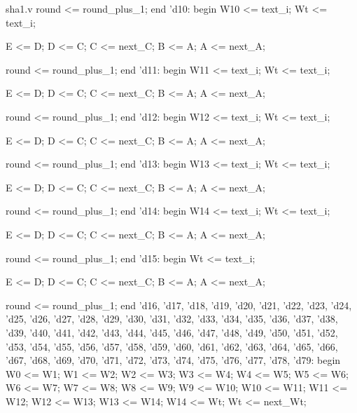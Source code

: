 \begin{chunk}{sha1.v}
          round <= round_plus_1;
        end
      'd10:
        begin
          W10 <= text_i;
          Wt <= text_i;
          
          E <= D;
          D <= C;
          C <= next_C;
          B <= A;
          A <= next_A;
            
          round <= round_plus_1;
        end
      'd11:
        begin
          W11 <= text_i;
          Wt <= text_i;
          
          E <= D;
          D <= C;
          C <= next_C;
          B <= A;
          A <= next_A;
            
          round <= round_plus_1;
        end
      'd12:
        begin
          W12 <= text_i;
          Wt <= text_i;
          
          E <= D;
          D <= C;
          C <= next_C;
          B <= A;
          A <= next_A;
            
          round <= round_plus_1;
        end
      'd13:
        begin
          W13 <= text_i;
          Wt <= text_i;
          
          E <= D;
          D <= C;
          C <= next_C;
          B <= A;
          A <= next_A;
            
          round <= round_plus_1;
        end
      'd14:
        begin
          W14 <= text_i;
          Wt <= text_i;
          
          E <= D;
          D <= C;
          C <= next_C;
          B <= A;
          A <= next_A;
            
          round <= round_plus_1;
        end
      'd15:
        begin
          Wt <= text_i;
          
          E <= D;
          D <= C;
          C <= next_C;
          B <= A;
          A <= next_A;
            
          round <= round_plus_1;
        end
      'd16,
      'd17,
      'd18,
      'd19,
      'd20,
      'd21,
      'd22,
      'd23,
      'd24,
      'd25,
      'd26,
      'd27,
      'd28,
      'd29,
      'd30,
      'd31,
      'd32,
      'd33,
      'd34,
      'd35,
      'd36,
      'd37,
      'd38,
      'd39,
      'd40,
      'd41,
      'd42,
      'd43,
      'd44,
      'd45,
      'd46,
      'd47,
      'd48,
      'd49,
      'd50,
      'd51,
      'd52,
      'd53,
      'd54,
      'd55,
      'd56,
      'd57,
      'd58,
      'd59,
      'd60,
      'd61,
      'd62,
      'd63,
      'd64,
      'd65,
      'd66,
      'd67,
      'd68,
      'd69,
      'd70,
      'd71,
      'd72,
      'd73,
      'd74,
      'd75,
      'd76,
      'd77,
      'd78,
      'd79:
        begin
          W0  <= W1;
          W1  <= W2;
          W2  <= W3;
          W3  <= W4;
          W4  <= W5;
          W5  <= W6;
          W6  <= W7;
          W7  <= W8;
          W8  <= W9;
          W9  <= W10;
          W10 <= W11;
          W11 <= W12;
          W12 <= W13;
          W13 <= W14;
          W14 <= Wt;
          Wt  <= next_Wt;
          

\end{chunk}
